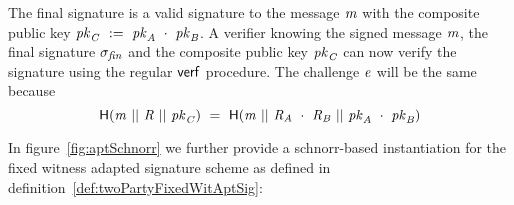 The final signature is a valid signature to the message $\mathit{m}$ with the composite public key $\mathit{pk}_{\mathit{C}} ~:=~ \mathit{pk}_{\mathit{A}} ~\cdot~ \mathit{pk}_{\mathit{B}}$.
A verifier knowing the signed message $\mathit{m}$, the final signature $\sigma_{\mathit{fin}}$ and the composite public key $\mathit{pk}_{\mathit{C}}$ can now verify the signature using the regular $\mathsf{verf}$ procedure.
The challenge $\mathit{e}$ will be the same because
\[ \mathsf{H} (\mathit{m} ~||~ \mathit{R} ~||~ \mathit{pk}_{\mathit{C}}) ~=~ \mathsf{H} (\mathit{m} ~||~ \mathit{R}_{\mathit{A}} ~\cdot~ \mathit{R}_{\mathit{B}} ~||~ \mathit{pk}_{\mathit{A}} ~\cdot~ \mathit{pk}_{\mathit{B}}) \]

In figure~\ref{fig:aptSchnorr} we further provide a schnorr-based instantiation for the fixed witness adapted signature scheme as defined in definition~\ref{def:twoPartyFixedWitAptSig}:


